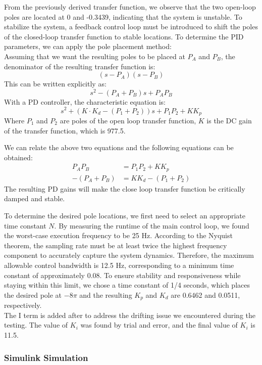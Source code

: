 \documentclass{article}
\begin{document}
From the previously derived transfer function, we observe that the two open-loop
poles are located at 0 and -0.3439, indicating that the system is unstable. To
stabilize the system, a feedback control loop must be introduced to shift the
poles of the closed-loop transfer function to stable locations. To determine the
PID parameters, we can apply the pole placement method: \\

Assuming that we want the resulting poles to be placed at $P_A$ and $P_B$, the
denominator of the resulting transfer function is:
\[
(s-P_A)(s-P_B)
\]
This can be written explicitly as:
\[
s^2 - (P_A + P_B)s + P_AP_B
\]
With a PD controller, the characteristic equation is:
\[
s^2 + (K \cdot K_d - (P_1 + P_2))s + P_1P_2 + KK_p
\]
Where $P_1$ and $P_2$ are poles of the open loop transfer function, $K$ is the
DC gain of the transfer function, which is 977.5.

We can relate the above two equations and the following equations can be obtained:
\begin{align*}
    P_AP_B &=  P_1P_2 + KK_p\\
    -(P_A + P_B) &= KK_d - (P_1 + P_2)
\end{align*}
The resulting PD gains will make the close loop transfer function be critically
damped and stable.

To determine the desired pole locations, we first need to select an appropriate
time constant $N$. By measuring the runtime of the main control loop, we found
the worst-case execution frequency to be 25 Hz. According to the Nyquist
theorem, the sampling rate must be at least twice the highest frequency
component to accurately capture the system dynamics. Therefore, the maximum
allowable control bandwidth is 12.5 Hz, corresponding to a minimum time constant
of approximately 0.08. To ensure stability and responsiveness while staying
within this limit, we chose a time constant of 1/4 seconds, which places the
desired pole at $-8\pi$ and the resulting $K_p$ and $K_d$ are 0.6462 and 0.0511,
respectively. \\

The I term is added after to address the drifting issue we encountered during
the testing. The value of $K_i$ was found by trial and error, and the final
value of $K_i$ is 11.5. \\

\subsubsection{Simulink Simulation}
\end{document}
